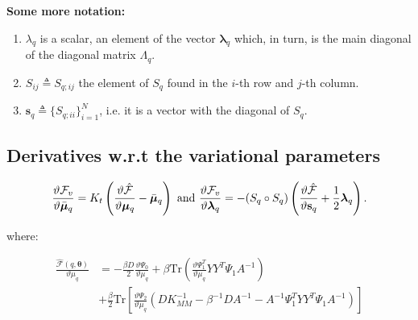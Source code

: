 \documentclass{article} %
\begin{document}
\textbf{Some more notation:} 
\begin{enumerate}
\item $\lambda_q$ is a scalar, an element of the vector $\boldsymbol \lambda_q$ which, in turn, is the main diagonal of the diagonal matrix $\Lambda_q$. 
\item $S_{ij} \triangleq S_{q;ij}$ the element of $S_q$ found in the $i$-th row and $j$-th column.
\item $\mathbf{s}_q \triangleq \lbrace S_{q;ii} \rbrace_{i=1}^N$, i.e. it is a vector with the diagonal of $S_q$.
\end{enumerate}

\subsection{Derivatives w.r.t the variational parameters}
\begin{equation}
    \label{derivVarParamSuppl}
\frac{\vartheta \mathcal{F}_v}{\vartheta \bar{\boldsymbol \mu}_q} 
=  K_t \left( \frac{\vartheta \hat{\mathcal{F}}}{\vartheta \boldsymbol \mu_q} - \bar{\boldsymbol \mu}_q \right)
\text{ and }
 \frac{\vartheta \mathcal{F}_v}{\vartheta \boldsymbol \lambda_q}
= - ( S_q \circ S_q) \left( \frac{\vartheta \hat{\mathcal{F}}}{\vartheta \mathbf{s}_q} + \frac{1}{2} \boldsymbol \lambda_q \right).
\end{equation}

where:

\begin{align}
 \frac{\hat{\mathcal{F}}(q, \boldsymbol \theta)}{\vartheta \mu_q}
{}& = - \frac{\beta D}{2} \frac{\vartheta \Psi_0}{\vartheta \mu_q}
    + \beta \text{Tr} \left(\frac{\vartheta \Psi_1^T}{\vartheta \mu_q} Y Y^T \Psi_1 A^{-1} \right) \nonumber \\
{}& + \frac{\beta}{2} \text{Tr} \left[ \frac{\vartheta \Psi_2}{\vartheta \mu_q}
       \left(
	  D K_{MM}^{-1} - \beta^{-1} D A^{-1} - A^{-1} \Psi_1^T Y Y^T \Psi_1 A^{-1}
       \right) \right] \label{derivFTildeEfficientComputationMu}
\end{align}
\end{document}
